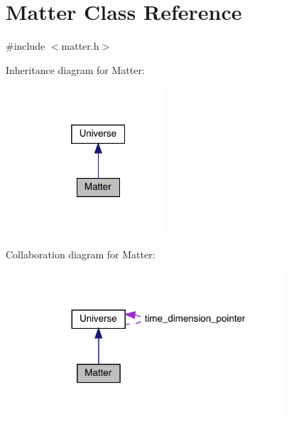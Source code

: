 \hypertarget{class_matter}{}\section{Matter Class Reference}
\label{class_matter}


{\ttfamily \#include $<$matter.\+h$>$}



Inheritance diagram for Matter\+:\nopagebreak
\begin{figure}[H]
\begin{center}
\leavevmode
\includegraphics[width=136pt]{class_matter__inherit__graph}
\end{center}
\end{figure}


Collaboration diagram for Matter\+:\nopagebreak
\begin{figure}[H]
\begin{center}
\leavevmode
\includegraphics[width=263pt]{class_matter__coll__graph}
\end{center}
\end{figure}
